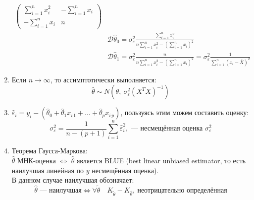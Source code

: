 \documentclass[12pt, a4paper]{article}
\newcommand{\dev}{\mathcal{D}}
\begin{document}
\begin{enumerate}
\[\begin{aligned}
\begin{pmatrix}
            \sum_{i = 1}^{n} x_i^2 & -\sum_{i = 1}^{n} x_i\\
            -\sum_{i = 1}^{n} x_i & n
        \end{pmatrix}\\
        & \dev \hat \theta_0 = \sigma_{\varepsilon}^2 \frac{\sum_{i = 1}^{n} x_i^2}{n \sum_{i = 1}^{n} x_i^2 - \left( \sum_{i = 1}^{n} x_i \right)^2}\\
        & \dev \hat \theta_1 = \sigma_{\varepsilon}^2 \frac{n}{n \sum_{i = 1}^{n} x_i^2 - \left( \sum_{i = 1}^{n} x_i \right)^2} = \sigma_{\varepsilon}^2 \frac{1}{\sum_{i = 1}^{n} {\left( x_i - \overline{X} \right)}^2 }
    \end{aligned}
    \]
    \item Если $n \to \infty$, то ассимптотически выполняется:
    \[
    \hat \theta \sim N\left( \theta,\ \sigma_{\varepsilon}^2 (X^T X)^{-1} \right)
    \]
    \item $\hat \varepsilon_i = y_i - \left( \hat \theta_0 + \hat \theta_1 x_{i\, 1} + \dots + \hat \theta_p x_{i\, p} \right)$, пользуясь этим можем составить оценку:
    \[
    \sigma^2_{\varepsilon} = \frac{1}{n - (p + 1)} \sum_{i = 1}^{n} \hat \varepsilon^2_i,\text{ --- несмещённая оценка $\sigma^2_{\varepsilon}$}
    \]
    \item Теорема Гаусса-Маркова:\\
    $\hat \theta$ МНК-оценка $\Leftrightarrow$ $\hat \theta$ является BLUE (best linear unbiased estimator, то есть наилучшая линейная по $y$ несмещённая оценка).\\
    В данном случае наилучшая обозначает:
    \[
    \hat \theta\text{ --- наилучшая} \Leftrightarrow \forall \tilde {\theta}\quad K_{\tilde {\theta}} - K_{\hat{\theta}},\ \text{неотрицательно определённая}
    \]
\end{enumerate}
\end{document}
